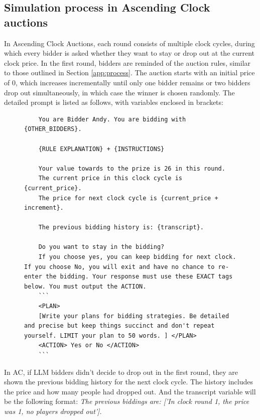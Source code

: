 \documentclass{article} %
\begin{document}
\subsection{Simulation process in Ascending Clock auctions}\label{app:dynamic}

In Ascending Clock Auctions, each round consists of multiple clock cycles, during which every bidder is asked whether they want to stay or drop out at the current clock price.
In the first round, bidders are reminded of the auction rules, similar to those outlined in Section \ref{app:process}.
The auction starts with an initial price of 0, which increases incrementally until only one bidder remains or two bidders drop out simultaneously, in which case the winner is chosen randomly.
The detailed prompt is listed as follows, with variables enclosed in brackets:

\begin{figure}[H]
\centering
\begin{minipage}{0.95\textwidth}
\begin{lstlisting}
    You are Bidder Andy. You are bidding with {OTHER_BIDDERS}.

    {RULE EXPLANATION} + {INSTRUCTIONS}

    Your value towards to the prize is 26 in this round.
    The current price in this clock cycle is {current_price}.
    The price for next clock cycle is {current_price + increment}.

    The previous bidding history is: {transcript}.

    Do you want to stay in the bidding?
    If you choose yes, you can keep bidding for next clock. If you choose No, you will exit and have no chance to re-enter the bidding. Your response must use these EXACT tags below. You must output the ACTION.
    ```
    <PLAN>
    [Write your plans for bidding strategies. Be detailed and precise but keep things succinct and don't repeat yourself. LIMIT your plan to 50 words. ] </PLAN>
    <ACTION> Yes or No </ACTION>
    ```
\end{lstlisting}
\end{minipage}
\label{fig:ac_prompt}
\end{figure}

In AC, if LLM bidders didn't decide to drop out in the first round, they are shown the previous bidding history for the next clock cycle. The history includes the price and how many people had dropped out.
And the transcript variable will be the following format:
\textit{    The previous biddings are:
    ['In clock round 1, the price was 1,
    no players dropped out'].}
\end{document}
